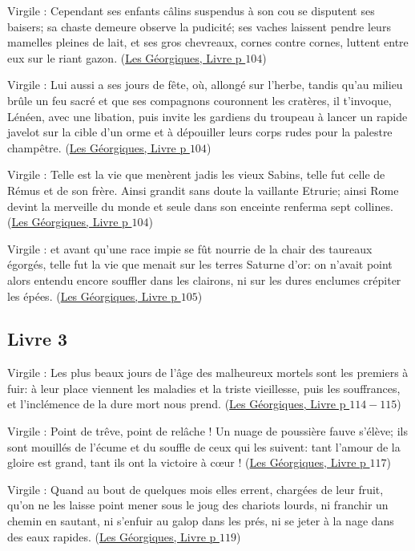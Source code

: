 \documentclass[a4paper, 11pt, hidelinks]{article}
\newcommand{\bs}{\bigskip}
\newcommand{\rb}[1]{\Romanbar{#1}}
\newcommand{\citer}[3]{\bs \begin{center} \textcolor{authorGray}{#1 :} \textcolor{citationRed}{\og #2 \fg} \textcolor{authorGray}{(\underline{#3})} \end{center} \bs}
\begin{document}
\citer{Virgile}{Cependant ses enfants câlins suspendus à son cou se disputent ses baisers; sa chaste demeure observe la pudicité;
ses vaches laissent pendre leurs mamelles pleines de lait, et ses gros chevreaux, cornes contre cornes, luttent entre eux sur le
riant gazon.}{Les Géorgiques, Livre \rb{2} p $104$}


\citer{Virgile}{Lui aussi a ses jours de fête, où, allongé sur l'herbe, tandis qu'au milieu brûle un feu sacré et que ses compagnons
couronnent les cratères, il t'invoque, Lénéen, avec une libation, puis invite les gardiens du troupeau à lancer un rapide javelot sur 
la cible d'un orme et à dépouiller leurs corps rudes pour la palestre champêtre.}{Les Géorgiques, Livre \rb{2} p $104$}


\citer{Virgile}{Telle est la vie que menèrent jadis les vieux Sabins, telle fut celle de Rémus et de son frère. Ainsi grandit sans 
doute la vaillante Etrurie; ainsi Rome devint la merveille du monde et seule dans son enceinte renferma sept collines.}{Les Géorgiques, Livre \rb{2} p $104$}


\citer{Virgile}{et avant qu'une race impie se fût nourrie de la chair des taureaux égorgés, telle fut la vie que menait sur les terres
Saturne d'or: on n'avait point alors entendu encore souffler dans les clairons, ni sur les dures enclumes crépiter les épées.}{Les Géorgiques, Livre \rb{2} p $105$}



\subsection{Livre 3}


\citer{Virgile}{Les plus beaux jours de l'âge des malheureux mortels sont les premiers à fuir: à leur place viennent les maladies
et la triste vieillesse, puis les souffrances, et l'inclémence de la dure mort nous prend.}{Les Géorgiques, Livre \rb{3} p $114-115$}


\citer{Virgile}{Point de trêve, point de relâche ! Un nuage de poussière fauve s'élève; ils sont mouillés de l'écume et du souffle de 
ceux qui les suivent: tant l'amour de la gloire est grand, tant ils ont la victoire à c\oe ur !}{Les Géorgiques, Livre \rb{3} p $117$}


\citer{Virgile}{Quand au bout de quelques mois elles errent, chargées de leur fruit, qu'on ne les laisse point mener sous le joug des 
chariots lourds, ni franchir un chemin en sautant, ni s'enfuir au galop dans les prés, ni se jeter à la nage dans des eaux rapides.}{Les Géorgiques, Livre \rb{3} p $119$}
\end{document}
